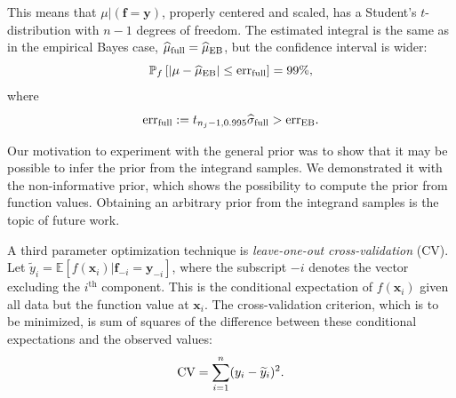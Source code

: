 \documentclass{iitthesis}          %
\newcommand{\bm}[1]{\boldsymbol{#1}}
\newcommand{\Ex}{\mathbb{E}}
\newcommand{\vf}{\bm{f}}
\newcommand{\vx}{\bm{x}}
\newcommand{\vy}{\bm{y}}
\newcommand{\hmu}{\widehat{\mu}}
\newcommand{\hsigma}{\widehat{\sigma}}
\newcommand{\MLE}{\textup{EB}}
\newcommand{\err}{\textup{err}}
\begin{document}
This means that $\mu \vert (\vf = \vy )$, properly centered and scaled, has a Student's $t$-distribution with $n-1$ degrees of freedom.   The estimated integral is the same as in the empirical Bayes case, $\hmu_{\textup{full}} = \hmu_{\MLE}$, but the confidence interval is wider:
\begin{equation*}
\mathbb{P}_f \left[
|\mu-\hmu_\MLE| \leq \err_{\textup{full}} \right]  = 99\%,
\end{equation*}
where
\begin{equation*}
\err_{\textup{full}} 
:= t_{n_j-1,0.995} \hsigma_{\textup{full}} > \err_\MLE .
\end{equation*}


\fi

Our motivation to experiment with the general prior was to show that it may be possible to infer the prior from the integrand samples. We demonstrated it with the non-informative prior, which shows the possibility to compute the prior from function values. Obtaining an arbitrary prior from the integrand samples is the topic of future work.


























 \label{sec:GCV}

A third parameter optimization technique is \emph{leave-one-out cross-validation} (CV).  Let $\widetilde{y}_i = \Ex[f(\vx_i ) | \vf_{-i} = \vy_{-i}]$, where the subscript $-i$ denotes the vector excluding the $i^{\text{th}}$ component.  This is the conditional expectation of $f(\vx_i )$ given all data but the function value at $\vx_i$.  The cross-validation criterion, which is to be minimized, is sum of squares of the difference between these conditional expectations and the observed values:
\begin{equation} \label{FJH:eq:CVA}
\textup{CV} = \sum_{i=1}^n (y_i - \widetilde{y}_i)^2.
\end{equation}
\end{document}
